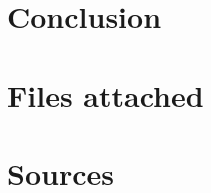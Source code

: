 \documentclass{article}
\begin{document}
\section*{Conclusion}

\section*{Files attached}

\section*{Sources}


\begin{comment}
\begin{itemize}
	\item MatLab (http://www.mathworks.nl/products/matlab/)
	\item VL\_Feat (http://www.vlfeat.org/)
	\item LibSVM (http://www.csie.ntu.edu.tw/cjlin/libsvm/)
	\item Caltech Vision Group (http://www.vision.caltech.edu/)
\end{itemize}
\end{comment}
\end{document}
